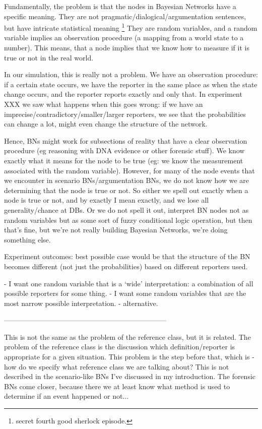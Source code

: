 Fundamentally, the problem is that the nodes in Bayesian Networks have a specific meaning. They are not pragmatic/dialogical/argumentation sentences, but have intricate statistical meaning \footnote{secret fourth good sherlock episode.} They are random variables, and a random variable implies an observation procedure (a mapping from a world state to a number). This means, that a node implies that we know how to measure if it is true or not in the real world.

 In our simulation, this is really not a problem. We have an observation procedure: if a certain state occurs, we have the reporter in the same place as when the state change occurs, and the reporter reports exactly and only that. In experiment XXX we saw what happens when this goes wrong: if we have an imprecise/contradictory/smaller/larger reporters, we see that the probabilities can change a lot, might even change the structure of the network. 
 
Hence, BNs might work for subsections of reality that have a clear observation procedure (eg reasoning with DNA evidence or other forensic stuff). We know exactly what it means for the node to be true (eg: we know the measurement associated with the random variable). However, for many of the node events that we encounter in scenario BNs/argumentation BNs, we do not know how we are determining that the node is true or not. So either we spell out exactly when a node is true or not, and by exactly I mean exactly, and we lose all generality/chance at DBs. Or we do not spell it out, interpret BN nodes not as random variables but as some sort of fuzzy conditional logic operation, but then that's fine, but we're not really building Bayesian Networks, we're doing something else.

Experiment outcomes: best possible case would be that the structure of the BN becomes different (not just the probabilities) based on different reporters used.

- I want one random variable that is a `wide' interpretation: a combination of all possible reporters for some thing.
- I want some random variables that are the most narrow possible interpretation.
- alternative.

---------------------------------------------------------------------

This is not the same as the problem of the reference class, but it is related. The problem of the reference class is the discussion which definition/reporter is appropriate for a given situation. This problem is the step before that, which is - how do we specify what reference class we are talking about? This is not described in the scenario-like BNs I've discussed in my introduction. The forensic BNs come closer, because there we at least know what method is used to determine if an event happened or not...

